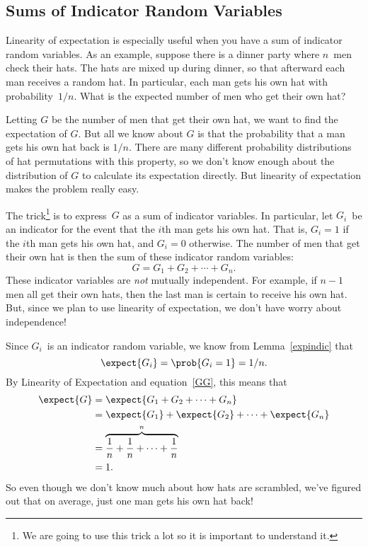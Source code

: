 \subsection{Sums of Indicator Random Variables}\label{sec:hat_check}

Linearity of expectation is especially useful when you have a sum of
indicator random variables.  As an example, suppose there is a dinner
party where $n$~men check their hats.  The hats are mixed up during
dinner, so that afterward each man receives a random hat.  In
particular, each man gets his own hat with probability~$1/n$.  What is
the expected number of men who get their own hat?

Letting $G$ be the number of men that get their own hat, we want to find
the expectation of $G$.  But all we know about $G$ is that the probability
that a man gets his own hat back is $1/n$.  There are many different
probability distributions of hat permutations with this property, so we
don't know enough about the distribution of $G$ to calculate its
expectation directly.  But linearity of expectation makes the problem
really easy.

The trick\footnote{We are going to use this trick a lot so it is
  important to understand it.} is to express~$G$ as a sum of indicator
variables.  In particular, let $G_i$~be an indicator for the event
that the $i$th man gets his own hat.  That is, $G_i = 1$ if the $i$th
man gets his own hat, and $G_i = 0$ otherwise.  The number of men that
get their own hat is then the sum of these indicator random variables:
\begin{equation}\label{GG}
    G = G_1 + G_2 + \cdots + G_n.
\end{equation}
These indicator variables are \emph{not} mutually independent.  For
example, if $n-1$ men all get their own hats, then the last man is
certain to receive his own hat.  But, since we plan to use linearity
of expectation, we don't have worry about independence!

Since $G_i$~is an indicator random variable, we know from
Lemma~\ref{expindic} that
\begin{equation}
    \expect{G_i}= \prob{G_i=1} = 1/n.
\end{equation} 
By Linearity of Expectation and equation~\eqref{GG}, this means that
\begin{align*}
\expect{G} & = \expect{G_1 + G_2 + \cdots + G_n} \\
       & = \expect{G_1} + \expect{G_2} + \cdots + \expect{G_n}\\
       & = \overbrace{\frac{1}{n} + \frac{1}{n} + \cdots + \frac{1}{n}}^n \\
       &= 1.
\end{align*}
So even though we don't know much about how hats are scrambled, we've
figured out that on average, just one man gets his own hat back!

